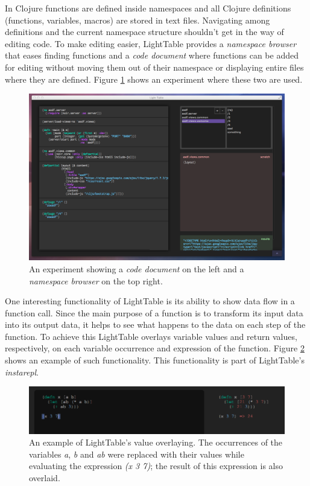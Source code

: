 \documentclass{./llncs2e/llncs}
\begin{document}
	In Clojure functions are defined inside namespaces and all Clojure definitions (functions, variables, macros) are stored in text files. Navigating among definitions and the current namespace structure shouldn't get in the way of editing code. To make editing easier, LightTable provides a \emph{namespace browser} that eases finding functions and a \emph{code document} where functions can be added for editing without moving them out of their namespace or displaying entire files where they are defined. Figure \ref{fig:lt:clojure:table} shows an experiment where these two are used.

	\begin{figure}
	  \centering
	  \includegraphics[width=1.0\textwidth]{img/lt_clojure_table}
	    \caption{An experiment showing a \emph{code document} on the left and a \emph{namespace browser} on the top right.}
	  \label{fig:lt:clojure:table}
	\end{figure} 

	One interesting functionality of LightTable is its ability to show data flow in a function call. Since the main purpose of a function is to transform its input data into its output data, it helps to see what happens to the data on each step of the function. To achieve this LightTable overlays variable values and return values, respectively, on each variable occurrence and expression of the function. Figure \ref{fig:lt:val:overlay} shows an example of such functionality. This functionality is part of LightTable's \emph{instarepl}.

	\begin{figure}
		\centering
		\includegraphics[width=1.0\textwidth]{img/lt_val_overlay}
			\caption{An example of LightTable's value overlaying. The occurrences of the variables \emph{a}, \emph{b} and \emph{ab} were replaced with their values while evaluating the expression \emph{(x 3 7)}; the result of this expression is also overlaid.}
		\label{fig:lt:val:overlay}
	\end{figure}
\end{document}
